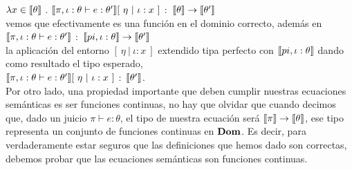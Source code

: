 $\lambda x \in \llbracket \theta \rrbracket$ . 
				$\llbracket \pi,\iota:\theta \vdash e : \theta' \rrbracket[\ \eta \ | \ \iota:x \ ]$ $:$
				$\llbracket \theta \rrbracket \rightarrow \llbracket \theta' \rrbracket$\\

\noindent
vemos que efectivamente es una funci\'on en el dominio correcto, adem\'as en\\

$\llbracket \pi,\iota:\theta \vdash e : \theta' \rrbracket$ $:$ 
								$\llbracket pi,\iota:\theta \rrbracket \rightarrow \llbracket \theta' \rrbracket$\\

\noindent
la aplicaci\'on del entorno $[\ \eta \ | \ \iota:x \ ]$ extendido tipa perfecto 
con $\llbracket pi,\iota:\theta \rrbracket$ dando como resultado el tipo esperado,\\

$\llbracket \pi,\iota:\theta \vdash e : \theta' \rrbracket[\ \eta \ | \ \iota:x \ ]$ $:$ $\llbracket \theta' \rrbracket$.\\

Por otro lado, una propiedad importante que deben cumplir nuestras 
ecuaciones sem\'anticas es ser funciones continuas, no hay que olvidar
que cuando decimos que, dado un juicio $\pi \vdash e : \theta$, el tipo
de nuestra ecuaci\'on ser\'a $\llbracket \pi \rrbracket \rightarrow \llbracket \theta \rrbracket$, ese 
tipo representa un conjunto de funciones continuas en $\textbf{Dom}$. Es decir, para
verdaderamente estar seguros que las definiciones que hemos dado son 
correctas, debemos probar que las ecuaciones sem\'anticas son funciones 
continuas.

